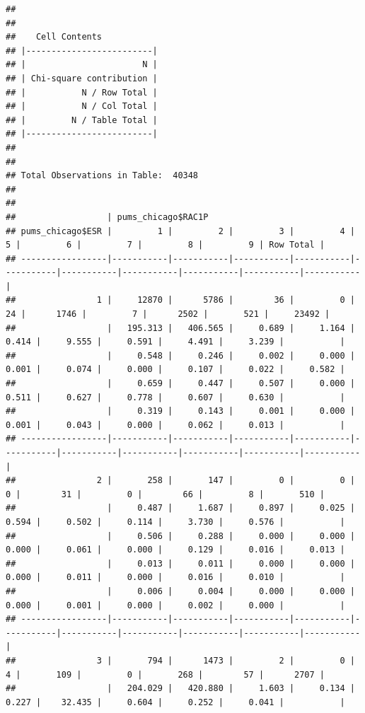 \documentclass[]{article}
\begin{document}
\begin{verbatim}
## 
##  
##    Cell Contents
## |-------------------------|
## |                       N |
## | Chi-square contribution |
## |           N / Row Total |
## |           N / Col Total |
## |         N / Table Total |
## |-------------------------|
## 
##  
## Total Observations in Table:  40348 
## 
##  
##                  | pums_chicago$RAC1P 
## pums_chicago$ESR |         1 |         2 |         3 |         4 |         5 |         6 |         7 |         8 |         9 | Row Total | 
## -----------------|-----------|-----------|-----------|-----------|-----------|-----------|-----------|-----------|-----------|-----------|
##                1 |     12870 |      5786 |        36 |         0 |        24 |      1746 |         7 |      2502 |       521 |     23492 | 
##                  |   195.313 |   406.565 |     0.689 |     1.164 |     0.414 |     9.555 |     0.591 |     4.491 |     3.239 |           | 
##                  |     0.548 |     0.246 |     0.002 |     0.000 |     0.001 |     0.074 |     0.000 |     0.107 |     0.022 |     0.582 | 
##                  |     0.659 |     0.447 |     0.507 |     0.000 |     0.511 |     0.627 |     0.778 |     0.607 |     0.630 |           | 
##                  |     0.319 |     0.143 |     0.001 |     0.000 |     0.001 |     0.043 |     0.000 |     0.062 |     0.013 |           | 
## -----------------|-----------|-----------|-----------|-----------|-----------|-----------|-----------|-----------|-----------|-----------|
##                2 |       258 |       147 |         0 |         0 |         0 |        31 |         0 |        66 |         8 |       510 | 
##                  |     0.487 |     1.687 |     0.897 |     0.025 |     0.594 |     0.502 |     0.114 |     3.730 |     0.576 |           | 
##                  |     0.506 |     0.288 |     0.000 |     0.000 |     0.000 |     0.061 |     0.000 |     0.129 |     0.016 |     0.013 | 
##                  |     0.013 |     0.011 |     0.000 |     0.000 |     0.000 |     0.011 |     0.000 |     0.016 |     0.010 |           | 
##                  |     0.006 |     0.004 |     0.000 |     0.000 |     0.000 |     0.001 |     0.000 |     0.002 |     0.000 |           | 
## -----------------|-----------|-----------|-----------|-----------|-----------|-----------|-----------|-----------|-----------|-----------|
##                3 |       794 |      1473 |         2 |         0 |         4 |       109 |         0 |       268 |        57 |      2707 | 
##                  |   204.029 |   420.880 |     1.603 |     0.134 |     0.227 |    32.435 |     0.604 |     0.252 |     0.041 |           | 

\end{verbatim}
\end{document}
